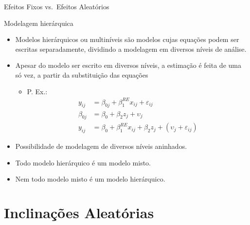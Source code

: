 \documentclass[9pt,ignorenonframetext,aspectratio=169]{beamer}
\providecommand{\tightlist}{%
  \setlength{\itemsep}{0pt}\setlength{\parskip}{0pt}}
\begin{document}
\begin{frame}{Efeitos Fixos vs.~Efeitos Aleatórios}
\end{frame}

\begin{frame}{Modelagem hierárquica}
\protect\hypertarget{modelagem-hieruxe1rquica}{}

\begin{itemize}[<+->]
\tightlist
\item
  \alert<1>{Modelos hierárquicos ou multiníveis são modelos cujas equações 
  podem ser escritas separadamente, dividindo a modelagem em diversos níveis de
  análise.}
\item
  \alert<2>{Apesar do modelo ser escrito em diversos níveis, a estimação é feita
  de uma só vez, a partir da substituição das equações}

  \begin{itemize}[<+->]
  \tightlist
  \item
    \alert<3>{P. Ex.: 
    \begin{align}
    y_{ij} &= \beta_{0j} + \beta_1^{RE}x_{ij} + \varepsilon_{ij}\\
    \beta_{0j} &= \beta_0 + \beta_2 z_j + \upsilon_j \\
    y_{ij} &= \beta_0 + \beta_1^{RE} x_{ij} + \beta_2 z_j + (\upsilon_j + \varepsilon_{ij})
    \end{align}
    }
  \end{itemize}
\item
  \alert<4>{Possibilidade de modelagem de diversos níveis aninhados.}
\item
  \alert<5>{Todo modelo hierárquico é um modelo misto.}
\item
  \alert<6>{Nem todo modelo misto é um modelo hierárquico.}
\end{itemize}

\end{frame}

\hypertarget{inclinauxe7uxf5es-aleatuxf3rias}{%
\section{Inclinações Aleatórias}\label{inclinauxe7uxf5es-aleatuxf3rias}}
\end{document}
